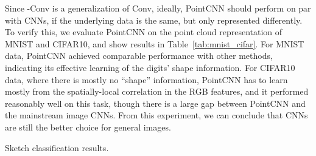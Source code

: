 \documentclass{article}
\begin{document}
Since -Conv is a generalization of Conv, ideally, PointCNN should perform on par with CNNs, if the underlying data is the same, but only represented differently. To verify this, we evaluate PointCNN on the point cloud representation of MNIST and CIFAR10, and show results in Table~\ref{tab:mnist_cifar}. For MNIST data, PointCNN achieved comparable performance with other methods, indicating its effective learning of the digits' shape information. For CIFAR10 data, where there is mostly no ``shape'' information, PointCNN has to learn mostly from the spatially-local correlation in the RGB features, and it performed reasonably well on this task, though there is a large gap between PointCNN and the mainstream image CNNs. From this experiment, we can conclude that CNNs are still the better choice for general images.

\begin{table}[h!]
\begin{minipage}{.5\linewidth}
      \centering
      \caption{Sketch classification results.}
      \label{tab:sketches}
\end{minipage}
\begin{minipage}{.5\linewidth}
      \centering
      \caption{Image classification results.}
      \label{tab:mnist_cifar}
\end{minipage}
\end{table}
\end{document}
